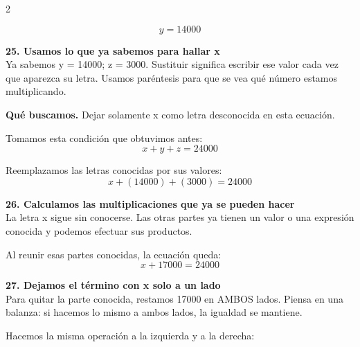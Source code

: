 \documentclass[11pt,a4paper,landscape]{article}
\begin{document}
\begin{multicols*}{2}
\begin{minipage}{\linewidth}
\[y=14000\]
\end{minipage}\par\medskip
\noindent\begin{minipage}{\linewidth}\textbf{25. Usamos lo que ya sabemos para hallar x}\\[2pt]Ya sabemos y = 14000; z = 3000. Sustituir significa escribir ese valor cada vez que aparezca su letra. Usamos paréntesis para que se vea qué número estamos multiplicando.
\par\smallskip\textbf{Qué buscamos.} Dejar solamente x como letra desconocida en esta ecuación.
\par\smallskip Tomamos esta condición que obtuvimos antes:
\[x + y + z = 24000\]
\par\smallskip Reemplazamos las letras conocidas por sus valores:
\[x + \left(14000\right) + \left(3000\right)=24000\]
\end{minipage}\par\medskip
\noindent\begin{minipage}{\linewidth}\textbf{26. Calculamos las multiplicaciones que ya se pueden hacer}\\[2pt]La letra x sigue sin conocerse. Las otras partes ya tienen un valor o una expresión conocida y podemos efectuar sus productos.
\par{}\par\smallskip
\par\smallskip Al reunir esas partes conocidas, la ecuación queda:
\[x + 17000=24000\]
\end{minipage}\par\medskip
\noindent\begin{minipage}{\linewidth}\textbf{27. Dejamos el término con x solo a un lado}\\[2pt]Para quitar la parte conocida, restamos 17000 en AMBOS lados. Piensa en una balanza: si hacemos lo mismo a ambos lados, la igualdad se mantiene.
\par\smallskip Hacemos la misma operación a la izquierda y a la derecha:

\end{minipage}
\end{multicols*}
\end{document}
